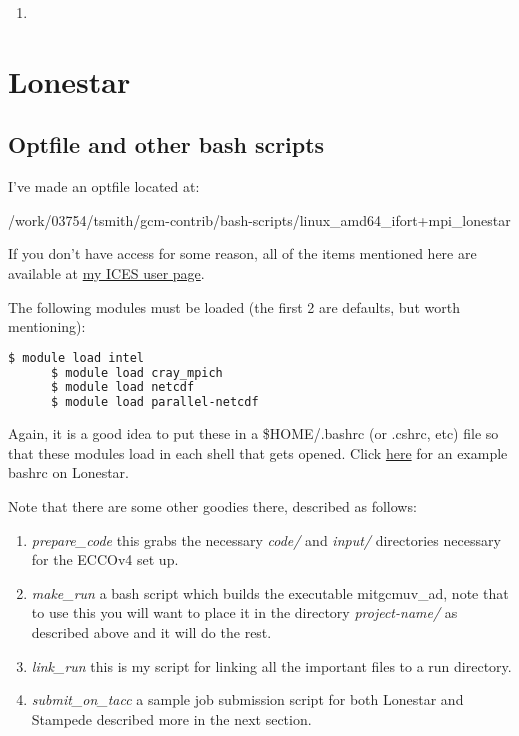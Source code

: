 \documentclass[a4paper,11pt]{article}
\begin{document}
\begin{enumerate}
	\item  
\end{enumerate} 

\section{Lonestar} 
\label{lonestar}

	\subsection{Optfile and other bash scripts}
	
	I've made an optfile located at: 
	
	/work/03754/tsmith/gcm-contrib/bash-scripts/linux\_amd64\_ifort+mpi\_lonestar 

	If you don't have access for some reason, all of the items mentioned here are available at \href{http://users.ices.utexas.edu/~tsmith/bash-scripts/}{my ICES user page}.

	The following modules must be loaded (the first 2 are defaults, but worth mentioning): 

	\begin{lstlisting}[language=bash]
	  $ module load intel
	  $ module load cray_mpich
	  $ module load netcdf
	  $ module load parallel-netcdf
	\end{lstlisting}

	Again, it is a good idea to put these in a \$HOME/.bashrc (or .cshrc, etc) file so that these modules load in each shell that gets opened. Click \href{http://users.ices.utexas.edu/~tsmith/bash-scripts/bashrc_tsmith_lonestar}{here} for an example bashrc on Lonestar.


	Note that there are some other goodies there, described as follows:
	\begin{enumerate}
	  \item \textit{prepare\_code} this grabs the necessary \textit{code/} and \textit{input/} directories necessary for the ECCOv4 set up. 
	  \item \textit{make\_run} a bash script which builds the executable mitgcmuv\_ad, note that to use this you will want to place it in the directory \textit{project-name/} as described above and it will do the rest. 
	  \item \textit{link\_run} this is my script for linking all the important files to a run directory.  
	  \item \textit{submit\_on\_tacc} a sample job submission script for both Lonestar and Stampede described more in the next section.
	\end{enumerate} 
\end{document}
